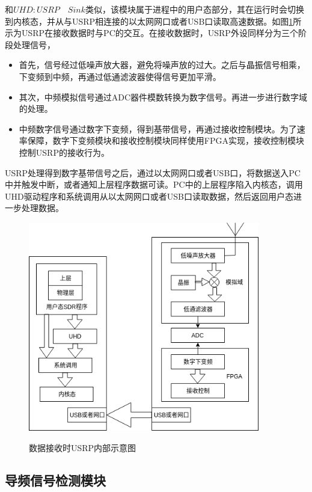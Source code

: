 \documentclass[master]{seuthesis} %
\begin{document}
\begin{Main}
和$UHD: USRP\quad Sink$类似，该模块属于进程中的用户态部分，其在运行时会切换到内核态，并从与USRP相连接的以太网网口或者USB口读取高速数据。如图\ref{usrp_source_theory}所示为USRP在接收数据时与PC的交互。在接收数据时，USRP外设同样分为三个阶段处理信号，

\begin{itemize}
    \item 首先，信号经过低噪声放大器，避免将噪声放的过大。之后与晶振信号相乘，下变频到中频，再通过低通滤波器使得信号更加平滑。
    \item 其次，中频模拟信号通过ADC器件模数转换为数字信号。再进一步进行数字域的处理。
    \item 中频数字信号通过数字下变频，得到基带信号，再通过接收控制模块。为了速率保障，数字下变频模块和接收控制模块同样使用FPGA实现，接收控制模块控制USRP的接收行为。
\end{itemize}

USRP处理得到数字基带信号之后，通过以太网网口或者USB口，将数据送入PC中并触发中断，或者通知上层程序数据可读。PC中的上层程序陷入内核态，调用UHD驱动程序和系统调用从以太网网口或者USB口读取数据，然后返回用户态进一步处理数据。

\begin{figure}
    \centering
    \includegraphics[width=0.9\textwidth]{images/usrp_source_theory}
    \caption{数据接收时USRP内部示意图}{} 
    \label{usrp_source_theory}
\end{figure}

\subsection{导频信号检测模块}


\end{Main}
\end{document}
